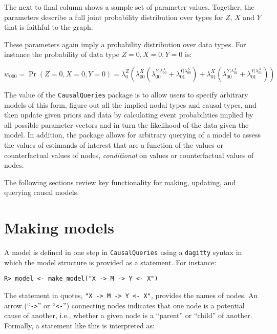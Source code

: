 \documentclass[
  11pt,
  article]{jss}
\begin{document}
The next to final column shows a sample set of parameter values.
Together, the parameters describe a full joint probability distribution
over types for \(Z\), \(X\) and \(Y\) that is faithful to the graph.

These parameters again imply a probability distribution over data types.
For instance the probability of data type \(Z=0, X=0, Y=0\) is:

\[w_{000}=\Pr(Z=0, X=0, Y=0) = \lambda^Z_0\left(\lambda^X_{00}(\lambda^{Y|\lambda^X_{00}}_{00}+\lambda^{Y|\lambda^X_{00}}_{01}) + \lambda^X_{01}(\lambda^{Y|\lambda^X_{01}}_{00}+\lambda^{Y|\lambda^X_{01}}_{01})\right)\]

The value of the \texttt{CausalQueries} package is to allow users to
specify arbitrary models of this form, figure out all the implied nodal
types and causal types, and then update given priors and data by
calculating event probabilities implied by all possible parameter
vectors and in turn the likelihood of the data given the model. In
addition, the package allows for arbitrary querying of a model to assess
the values of estimands of interest that are a function of the values or
counterfactual values of nodes, \emph{conditional} on values or
counterfactual values of nodes.

The following sections review key functionality for making, updating,
and querying causal models.

\hypertarget{sec-make}{%
\section{Making models}\label{sec-make}}

A model is defined in one step in \texttt{CausalQueries} using a
\texttt{dagitty} syntax \citep{textor_robust_2016} in which the model
structure is provided as a statement. For instance:

\begin{verbatim}
R> model <- make_model("X -> M -> Y <- X")
\end{verbatim}

The statement in quotes,
\texttt{"X\ -\textgreater{}\ M\ -\textgreater{}\ Y\ \textless{}-\ X"},
provides the names of nodes. An arrow (``\texttt{-\textgreater{}}'' or
``\texttt{\textless{}-}'') connecting nodes indicates that one node is a
potential cause of another, i.e., whether a given node is a ``parent''
or ``child'' of another. Formally, a statement like this is interpreted
as:
\end{document}
